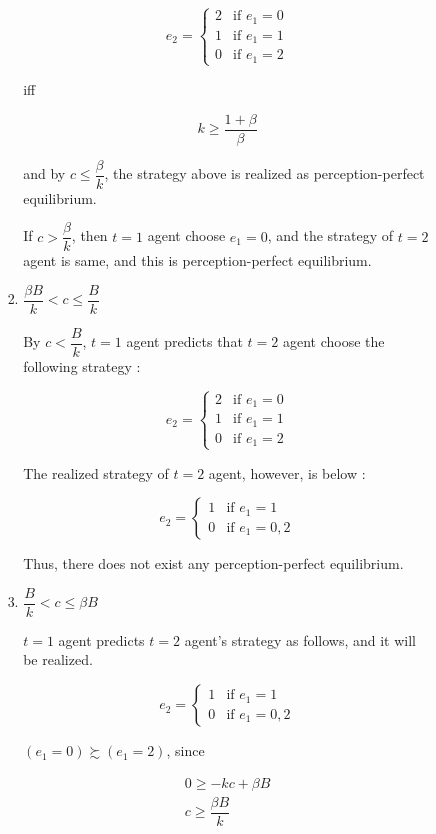 \documentclass{jsarticle}
\begin{document}
\begin{enumerate}
\begin{enumerate}
\begin{itemize}
\begin{enumerate}
 \[e_2 = \begin{cases}
 2 & \text{if } e_1=0 \\
 1 & \text{if } e_1=1 \\
 0 & \text{if } e_1=2
 \end{cases} \]
 
 iff
 
 \[ k \geq \dfrac{1+\beta}{\beta} \]
 
 and by $c \leq \dfrac{\beta}{k}$, the strategy above is realized as perception-perfect equilibrium.
 
 If $c > \dfrac{\beta}{k}$, then $t=1$ agent choose $e_1=0$, and the strategy of $t=2$ agent is same, and this is perception-perfect equilibrium.
 
 \item $ \dfrac{\beta B}{k} < c \leq \dfrac{B}{k} $
 
 By $c < \dfrac{B}{k}$, $t=1$ agent predicts that $t=2$ agent choose the following strategy :
 
 \[e_2 = \begin{cases}
 2 & \text{if } e_1=0 \\
 1 & \text{if } e_1=1 \\
 0 & \text{if } e_1=2
 \end{cases} \]
 
 The realized strategy of $t=2$ agent, however, is below :
 
 \[e_2 = \begin{cases}
  1 & \text{if } e_1=1 \\
 0 & \text{if } e_1=0,2
 \end{cases} \]
 
 Thus, there does not exist any perception-perfect equilibrium.
 
 \item $\dfrac{B}{k} < c \leq \beta B$
 
 $t=1$ agent predicts $t=2$ agent's strategy as follows, and it will be realized.
 
  \[e_2 = \begin{cases}
  1 & \text{if } e_1=1 \\
 0 & \text{if } e_1=0,2
 \end{cases} \]
 
 $(e_1=0) \succsim (e_1=2)$, since
 
  \begin{align*}
  0 \geq -kc + \beta B \\
  c \geq \dfrac{\beta B}{k}
  \end{align*}
 

\end{enumerate}
\end{itemize}
\end{enumerate}
\end{enumerate}
\end{document}
